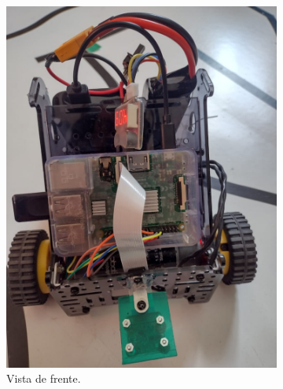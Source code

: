 \documentclass[11pt,a4paper]{article}
\begin{document}
	\begin{figure}[h!]
		\centering
		\begin{subfigure}{0.4\textwidth}
			\centering
			\includegraphics[width=\textwidth]{imagenes/robot_frente.jpeg}
			\caption{Vista de frente.}
		\end{subfigure}
		\hfill
		\begin{subfigure}{0.4\textwidth}
			\centering

\end{subfigure}
\end{figure}
\end{document}
